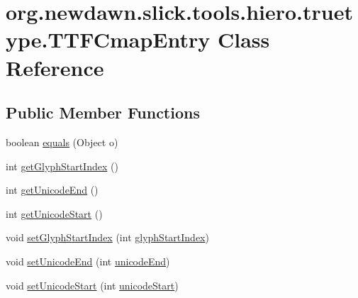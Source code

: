 \hypertarget{classorg_1_1newdawn_1_1slick_1_1tools_1_1hiero_1_1truetype_1_1_t_t_f_cmap_entry}{}\section{org.\+newdawn.\+slick.\+tools.\+hiero.\+truetype.\+T\+T\+F\+Cmap\+Entry Class Reference}
\label{classorg_1_1newdawn_1_1slick_1_1tools_1_1hiero_1_1truetype_1_1_t_t_f_cmap_entry}
\subsection*{Public Member Functions}
\begin{DoxyCompactItemize}
\item 
boolean \mbox{\hyperlink{classorg_1_1newdawn_1_1slick_1_1tools_1_1hiero_1_1truetype_1_1_t_t_f_cmap_entry_a7bf931af56159ab79ad5c793c50c237e}{equals}} (Object o)
\item 
int \mbox{\hyperlink{classorg_1_1newdawn_1_1slick_1_1tools_1_1hiero_1_1truetype_1_1_t_t_f_cmap_entry_a3132591c7a4eabb7d05b3b0ba1d35876}{get\+Glyph\+Start\+Index}} ()
\item 
int \mbox{\hyperlink{classorg_1_1newdawn_1_1slick_1_1tools_1_1hiero_1_1truetype_1_1_t_t_f_cmap_entry_ae4fa848e660e0046a5c99291f9a00f2f}{get\+Unicode\+End}} ()
\item 
int \mbox{\hyperlink{classorg_1_1newdawn_1_1slick_1_1tools_1_1hiero_1_1truetype_1_1_t_t_f_cmap_entry_a819647f72cc7915feadaf30573e27cf7}{get\+Unicode\+Start}} ()
\item 
void \mbox{\hyperlink{classorg_1_1newdawn_1_1slick_1_1tools_1_1hiero_1_1truetype_1_1_t_t_f_cmap_entry_a9654bd6d515a2cdb4d79b82b1b16273f}{set\+Glyph\+Start\+Index}} (int \mbox{\hyperlink{classorg_1_1newdawn_1_1slick_1_1tools_1_1hiero_1_1truetype_1_1_t_t_f_cmap_entry_ad7d0da37875efc20244b93ad930d73ad}{glyph\+Start\+Index}})
\item 
void \mbox{\hyperlink{classorg_1_1newdawn_1_1slick_1_1tools_1_1hiero_1_1truetype_1_1_t_t_f_cmap_entry_af8219c9254aeaf7c6389d9680ca0b288}{set\+Unicode\+End}} (int \mbox{\hyperlink{classorg_1_1newdawn_1_1slick_1_1tools_1_1hiero_1_1truetype_1_1_t_t_f_cmap_entry_acffa8eba3c1a7ba50e48c20edbc176b6}{unicode\+End}})
\item 
void \mbox{\hyperlink{classorg_1_1newdawn_1_1slick_1_1tools_1_1hiero_1_1truetype_1_1_t_t_f_cmap_entry_ac6d09deb166294bd1e4a0f901e992bcf}{set\+Unicode\+Start}} (int \mbox{\hyperlink{classorg_1_1newdawn_1_1slick_1_1tools_1_1hiero_1_1truetype_1_1_t_t_f_cmap_entry_abfc190d70995c9dab4cd3a9c42695f61}{unicode\+Start}})
\end{DoxyCompactItemize}
